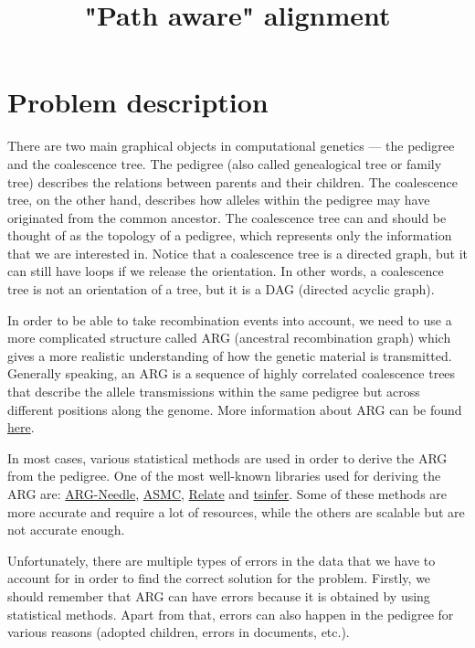 \documentclass[14pt]{extarticle}
\begin{document}
	
	
\title{"Path aware" alignment}
\date{}

\section{Problem description}

There are two main graphical objects in computational genetics --- the pedigree and the coalescence tree. The pedigree (also called genealogical tree or family tree) describes the relations between parents and their children. The coalescence tree, on the other hand, describes how alleles within the pedigree may have originated from the common ancestor. The coalescence tree can and should be thought of as the topology of a pedigree, which represents only the information that we are interested in. Notice that a coalescence tree is a directed graph, but it can still have loops if we release the orientation. In other words, a coalescence tree is not an orientation of a tree, but it is a DAG (directed acyclic graph).

In order to be able to take recombination events into account, we need to use a more complicated structure called ARG (ancestral recombination graph) which gives a more realistic understanding of how the genetic material is transmitted. Generally speaking, an ARG is a sequence of highly correlated coalescence trees that describe the allele transmissions within the same pedigree but across different positions along the genome.  More information about ARG can be found \href{https://nielsen-lab.github.io/pdfs/papers/argeval.pdf}{here}. 

In most cases, various statistical methods are used in order to derive the ARG from the pedigree. One of the most well-known libraries used for deriving the ARG are: \href{https://palamaralab.github.io/software/argneedle/}{ARG-Needle}, \href{https://palamaralab.github.io/software/asmc/}{ASMC}, \href{https://myersgroup.github.io/relate/}{Relate} and \href{https://www.ncbi.nlm.nih.gov/pmc/articles/PMC6726478/}{tsinfer}. Some of these methods are more accurate and require a lot of resources, while the others are scalable but are not accurate enough.

Unfortunately, there are multiple types of errors in the data that we have to account for in order to find the correct solution for the problem. Firstly, we should remember that ARG can have errors because it is obtained by using statistical methods. Apart from that, errors can also happen in the pedigree for various reasons (adopted children, errors in documents, etc.).  
\end{document}
